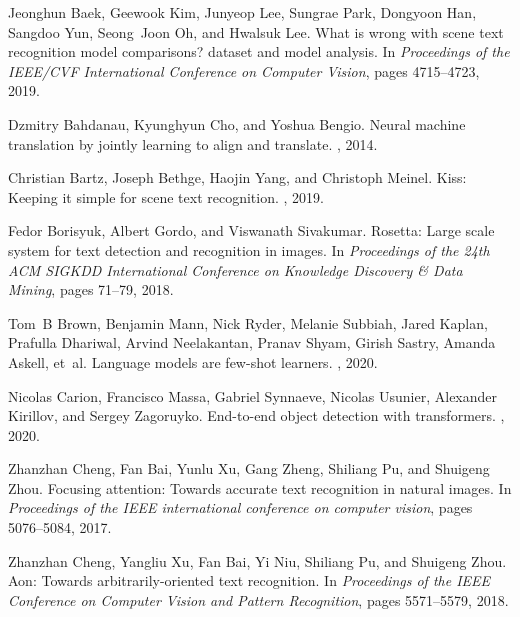 \documentclass[final]{cvpr}
\begin{document}
{\small
\begin{thebibliography}{10}\itemsep=-1pt

Jeonghun Baek, Geewook Kim, Junyeop Lee, Sungrae Park, Dongyoon Han, Sangdoo
  Yun, Seong~Joon Oh, and Hwalsuk Lee.
\newblock What is wrong with scene text recognition model comparisons? dataset
  and model analysis.
\newblock In {\em Proceedings of the IEEE/CVF International Conference on
  Computer Vision}, pages 4715--4723, 2019.

Dzmitry Bahdanau, Kyunghyun Cho, and Yoshua Bengio.
\newblock Neural machine translation by jointly learning to align and
  translate.
, 2014.

Christian Bartz, Joseph Bethge, Haojin Yang, and Christoph Meinel.
\newblock Kiss: Keeping it simple for scene text recognition.
, 2019.

Fedor Borisyuk, Albert Gordo, and Viswanath Sivakumar.
\newblock Rosetta: Large scale system for text detection and recognition in
  images.
\newblock In {\em Proceedings of the 24th ACM SIGKDD International Conference
  on Knowledge Discovery \& Data Mining}, pages 71--79, 2018.

Tom~B Brown, Benjamin Mann, Nick Ryder, Melanie Subbiah, Jared Kaplan, Prafulla
  Dhariwal, Arvind Neelakantan, Pranav Shyam, Girish Sastry, Amanda Askell,
  et~al.
\newblock Language models are few-shot learners.
, 2020.

Nicolas Carion, Francisco Massa, Gabriel Synnaeve, Nicolas Usunier, Alexander
  Kirillov, and Sergey Zagoruyko.
\newblock End-to-end object detection with transformers.
, 2020.

Zhanzhan Cheng, Fan Bai, Yunlu Xu, Gang Zheng, Shiliang Pu, and Shuigeng Zhou.
\newblock Focusing attention: Towards accurate text recognition in natural
  images.
\newblock In {\em Proceedings of the IEEE international conference on computer
  vision}, pages 5076--5084, 2017.

Zhanzhan Cheng, Yangliu Xu, Fan Bai, Yi Niu, Shiliang Pu, and Shuigeng Zhou.
\newblock Aon: Towards arbitrarily-oriented text recognition.
\newblock In {\em Proceedings of the IEEE Conference on Computer Vision and
  Pattern Recognition}, pages 5571--5579, 2018.


\end{thebibliography}}
\end{document}
